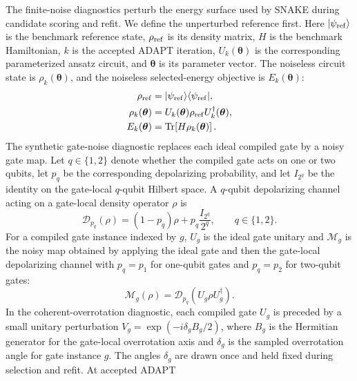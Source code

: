 \documentclass[
  reprint,
  amsmath,
  amssymb,
  aps,
  pra,
  nofootinbib,
  superscriptaddress,
  floatfix
]{revtex4-2}
\newcommand{\ket}[1]{|#1\rangle}
\newcommand{\bra}[1]{\langle #1|}
\begin{document}
The finite-noise diagnostics perturb the energy surface used by SNAKE during
candidate scoring and refit. We define the unperturbed reference first. Here
\(\ket{\psi_{\rm ref}}\) is the benchmark reference state, \(\rho_{\rm ref}\)
is its density matrix, \(H\) is the benchmark Hamiltonian, \(k\) is the accepted
ADAPT iteration, \(U_k(\boldsymbol{\theta})\) is the corresponding parameterized
ansatz circuit, and \(\boldsymbol{\theta}\) is its parameter vector. The
noiseless circuit state is \(\rho_k(\boldsymbol{\theta})\), and the noiseless
selected-energy objective is \(E_k(\boldsymbol{\theta})\):
\begin{equation*}
\begin{aligned}
\rho_{\rm ref}
&=\ket{\psi_{\rm ref}}\bra{\psi_{\rm ref}},
\\
\rho_k(\boldsymbol{\theta})
&=U_k(\boldsymbol{\theta})\rho_{\rm ref}U_k^\dagger(\boldsymbol{\theta}),
\\
E_k(\boldsymbol{\theta})
&=\operatorname{Tr}\!\left[H\rho_k(\boldsymbol{\theta})\right].
\end{aligned}
\end{equation*}
The synthetic gate-noise diagnostic replaces each ideal compiled gate by a
noisy gate map. Let \(q\in\{1,2\}\) denote whether the compiled gate acts on one
or two qubits, let \(p_q\) be the corresponding depolarizing probability, and
let \(I_{2^q}\) be the identity on the gate-local \(q\)-qubit Hilbert space. A
\(q\)-qubit depolarizing channel acting on a gate-local density operator
\(\rho\) is
\begin{equation*}
\mathcal D_{p_q}(\rho)
=(1-p_q)\rho+p_q\frac{I_{2^q}}{2^q},
\qquad
q\in\{1,2\}.
\end{equation*}
For a compiled gate instance indexed by \(g\), \(U_g\) is the ideal gate unitary
and \(\mathcal M_g\) is the noisy map obtained by applying the ideal gate and
then the gate-local depolarizing channel with \(p_q=p_1\) for one-qubit gates
and \(p_q=p_2\) for two-qubit gates:
\begin{equation*}
\mathcal M_g(\rho)
=
\mathcal D_{p_q}\!\left(U_g\rho U_g^\dagger\right).
\end{equation*}
In the coherent-overrotation diagnostic, each compiled gate \(U_g\) is preceded
by a small unitary perturbation \(V_g=\exp(-i\delta_gB_g/2)\), where \(B_g\) is
the Hermitian generator for the gate-local overrotation axis and \(\delta_g\) is
the sampled overrotation angle for gate instance \(g\). The angles \(\delta_g\)
are drawn once and held fixed during selection and refit. At accepted ADAPT
\end{document}
